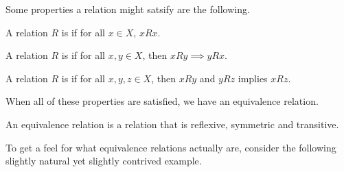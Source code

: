 \documentclass[a4paper]{scrreprt}
\begin{document}
Some properties a relation might satsify are the following.

\begin{definition}[Reflexive]
	A relation $R$ is  if for all $x \in X$, $x R x$.
\end{definition}

\begin{definition}[Symmetric]
	A relation $R$ is  if for all $x, y \in X$, then $xRy \implies y R x$.
\end{definition}

\begin{definition}[Transitive]
	A relation $R$ is  if for all $x, y, z \in X$, then $x R y$ and $y R z$ implies $x R z$.
\end{definition}

When all of these properties are satisfied, we have an equivalence relation.

\begin{definition}
	An equivalence relation is a relation that is reflexive, symmetric and transitive.
\end{definition}

To get a feel for what equivalence relations actually are, consider the following slightly natural yet slightly contrived example.
\end{document}
